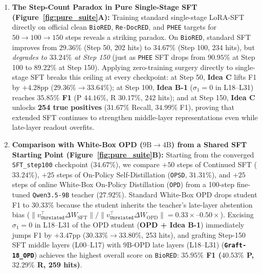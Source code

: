 \documentclass[11pt,a4paper]{article}
\begin{document}
\begin{enumerate}
    \item \textbf{The Step-Count Paradox in Pure Single-Stage SFT (Figure~\ref{fig:pure_suite}A):} Training standard single-stage LoRA-SFT directly on official clean \texttt{BioRED}, \texttt{Re-DocRED}, and \texttt{PHEE} targets for $50 \to 100 \to 150$ steps reveals a striking paradox. On \texttt{BioRED}, standard SFT improves from $29.36\%$ (Step 50, 202 hits) to $34.67\%$ (Step 100, 234 hits), but \emph{degrades to $33.24\%$ at Step 150} (just as \texttt{PHEE} SFT drops from $90.95\%$ at Step 100 to $89.22\%$ at Step 150). Applying zero-training surgery directly to single-stage SFT breaks this ceiling at every checkpoint: at Step 50, \textbf{Idea C} lifts F1 by $+4.28\text{pp}$ ($29.36\% \to 33.64\%$); at Step 100, \textbf{Idea B-1} ($\sigma_1=0$ in L18--L31) reaches \textbf{$35.85\%$ F1} (P $44.16\%$, R $30.17\%$, 242 hits); and at Step 150, \textbf{Idea C} unlocks \textbf{254 true positives} ($31.67\%$ Recall, $34.99\%$ F1), proving that extended SFT continues to strengthen middle-layer representations even while late-layer readout overfits.
    \item \textbf{Comparison with White-Box OPD ($9\text{B}\to 4\text{B}$) from a Shared SFT Starting Point (Figure~\ref{fig:pure_suite}B):} Starting from the converged \texttt{SFT\_step100} checkpoint ($34.67\%$), we compare $+50$ steps of Continued SFT ($33.24\%$), $+25$ steps of On-Policy Self-Distillation (\texttt{OPSD}, $31.31\%$), and $+25$ steps of online White-Box On-Policy Distillation (\texttt{OPD}) from a 100-step fine-tuned \texttt{Qwen3.5-9B} teacher ($27.92\%$). Standard White-Box OPD drops student F1 to $30.33\%$ because the student inherits the teacher's late-layer abstention bias ($\|v_{\texttt{Unrelated}}^\top \Delta W_{\text{SFT}}\| / \|v_{\texttt{Unrelated}}^\top \Delta W_{\text{OPD}}\| = 0.33\times\text{--}0.50\times$). Excising $\sigma_1=0$ in L18--L31 of the OPD student (\textbf{OPD + Idea B-1}) immediately jumps F1 by $+3.47\text{pp}$ ($30.33\% \to 33.80\%$, 253 hits), and grafting Step-150 SFT middle layers (L00--L17) with $9\text{B}$-OPD late layers (L18--L31) (\textbf{\texttt{Graft-18\_OPD}}) achieves the highest overall score on \texttt{BioRED}: \textbf{$35.95\%$ F1 ($40.53\%$ P, $32.29\%$ R, 259 hits)}.

\end{enumerate}
\end{document}
